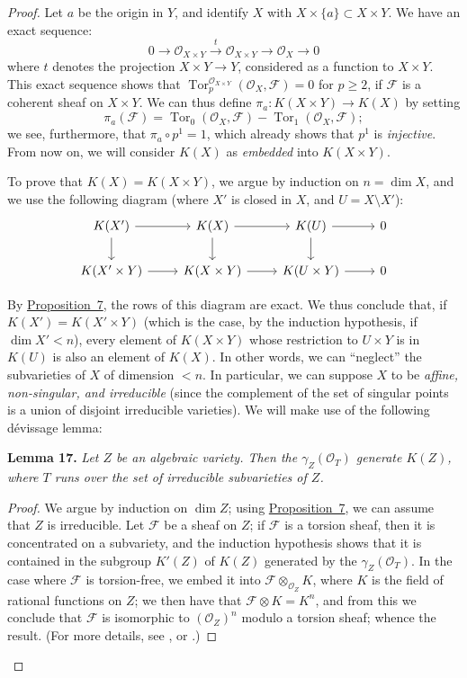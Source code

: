 \documentclass{article}
\newenvironment{itenv}[1]
  {\phantomsection\par\medskip\noindent\textbf{#1.}\itshape}
  {\medskip}
\newcommand{\scr}[1]{{\mathscr{#1}}}
\renewcommand{\geq}{\geqslant}
\DeclareMathOperator{\Tor}{Tor}
\newcommand{\oldpage}[1]{\marginpar{\footnotesize$\Big\vert$ \textit{p.~#1}}}
\begin{document}
\begin{proof}
  Let $a$ be the origin in $Y$, and identify $X$ with $X\times\{a\}\subset X\times Y$.
  We have an exact sequence:
  \[
    0 \to \scr{O}_{X\times Y} \xrightarrow{t} \scr{O}_{X\times Y} \to \scr{O}_X \to 0
  \]
  where $t$ denotes the projection $X\times Y\to Y$, considered as a function to $X\times Y$.
  This exact sequence shows that $\Tor_p^{\scr{O}_{X\times Y}}(\scr{O}_X,\scr{F})=0$ for $p\geq2$, if $\scr{F}$ is a coherent sheaf on $X\times Y$.
  We can thus define $\pi_a\colon K(X\times Y)\to K(X)$ by setting
  \[
    \pi_a(\scr{F}) = \Tor_0(\scr{O}_X,\scr{F}) - \Tor_1(\scr{O}_X,\scr{F});
  \]
  we see, furthermore, that $\pi_a\circ p^1=1$, which already shows that $p^1$ is \emph{injective}.
  From now on, we will consider $K(X)$ as \emph{embedded} into $K(X\times Y)$.

  To prove that $K(X)=K(X\times Y)$, we argue by induction on $n=\dim X$, and we use the following diagram (where $X'$ is closed in $X$, and $U=X\setminus X'$):
  \[
    \begin{tikzcd}
      K(X') \rar \dar
      & K(X) \rar \dar
      & K(U) \rar \dar
      & 0
    \\K(X'\times Y) \rar
      & K(X\times Y) \rar
      & K(U\times Y) \rar
      & 0
    \end{tikzcd}
  \]

\oldpage{117}
  By \hyperref[proposition7]{Proposition~7}, the rows of this diagram are exact.
  We thus conclude that, if $K(X')=K(X'\times Y)$ (which is the case, by the induction hypothesis, if $\dim X'<n$), every element of $K(X\times Y)$ whose restriction to $U\times Y$ is in $K(U)$ is also an element of $K(X)$.
  In other words, we can ``neglect'' the subvarieties of $X$ of dimension $<n$.
  In particular, we can suppose $X$ to be \emph{affine, non-singular, and irreducible} (since the complement of the set of singular points is a union of disjoint irreducible varieties).
  We will make use of the following d\'{e}vissage lemma:

  \begin{itenv}{Lemma 17}
  \label{lemma17}
    Let $Z$ be an algebraic variety.
    Then the $\gamma_Z(\scr{O}_T)$ generate $K(Z)$, where $T$ runs over the set of irreducible subvarieties of $Z$.
  \end{itenv}

  \begin{proof}
    We argue by induction on $\dim Z$;
    using \hyperref[proposition7]{Proposition~7}, we can assume that $Z$ is irreducible.
    Let $\scr{F}$ be a sheaf on $Z$;
    if $\scr{F}$ is a torsion sheaf, then it is concentrated on a subvariety, and the induction hypothesis shows that it is contained in the subgroup $K'(Z)$ of $K(Z)$ generated by the $\gamma_Z(\scr{O}_T)$.
    In the case where $\scr{F}$ is torsion-free, we embed it into $\scr{F}\otimes_{\scr{O}_Z}K$, where $K$ is the field of rational functions on $Z$;
    we then have that $\scr{F}\otimes K=K^n$, and from this we conclude that $\scr{F}$ is isomorphic to $(\scr{O}_Z)^n$ modulo a torsion sheaf;
    whence the result.
    (For more details, see \cite{14}, or \cite{6}.)
  \end{proof}


\end{proof}
\end{document}
